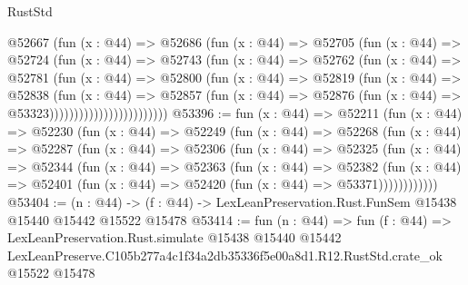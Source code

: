 \begin{lexlean}{RustStd}
\begin{coremodule}
                          @52667
                            (fun (x : @44) =>
                            @52686
                              (fun (x : @44) =>
                              @52705
                                (fun (x : @44) =>
                                @52724
                                  (fun (x : @44) =>
                                  @52743
                                    (fun (x : @44) =>
                                    @52762
                                      (fun (x : @44) =>
                                      @52781
                                        (fun (x : @44) =>
                                        @52800
                                          (fun (x : @44) =>
                                          @52819
                                            (fun (x : @44) =>
                                            @52838
                                              (fun (x : @44) =>
                                              @52857
                                                (fun (x : @44) =>
                                                @52876
                                                  (fun (x : @44) => @53323))))))))))))))))))))))))
@53396 := fun (x : @44) =>
  @52211
    (fun (x : @44) =>
    @52230
      (fun (x : @44) =>
      @52249
        (fun (x : @44) =>
        @52268
          (fun (x : @44) =>
          @52287
            (fun (x : @44) =>
            @52306
              (fun (x : @44) =>
              @52325
                (fun (x : @44) =>
                @52344
                  (fun (x : @44) =>
                  @52363
                    (fun (x : @44) =>
                    @52382
                      (fun (x : @44) =>
                      @52401 (fun (x : @44) => @52420 (fun (x : @44) => @53371))))))))))))
@53404 := (n : @44) ->
  (f : @44) -> LexLeanPreservation.Rust.FunSem @15438 @15440 @15442 @15522 @15478
@53414 := fun (n : @44) =>
  fun (f : @44) =>
  LexLeanPreservation.Rust.simulate
    @15438
    @15440
    @15442
    LexLeanPreserve.C105b277a4c1f34a2db35336f5e00a8d1.R12.RustStd.crate_ok
    @15522
    @15478
\end{coremodule}
\end{lexlean}
